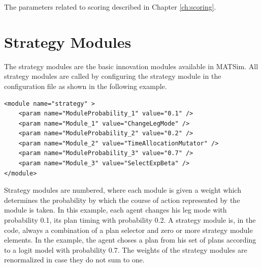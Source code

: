 The parameters related to scoring described in Chapter \ref{ch:scoring}.



\section{Strategy Modules}
\label{sec:strategymodules}

 

The strategy modules are the basic innovation modules available in MATSim. All strategy modules are called by configuring the strategy module in the configuration file as shown in the following example.

\begin{lstlisting}
<module name="strategy" >
    <param name="ModuleProbability_1" value="0.1" />
    <param name="Module_1" value="ChangeLegMode" />
    <param name="ModuleProbability_2" value="0.2" />
    <param name="Module_2" value="TimeAllocationMutator" />
    <param name="ModuleProbability_3" value="0.7" />
    <param name="Module_3" value="SelectExpBeta" />
</module>
\end{lstlisting}

Strategy modules are numbered, where each module is given a weight which determines the probability by which the course of action represented by the module is taken. In this example, each agent changes his leg mode with probability 0.1, its plan timing with probability 0.2. A strategy module is, in the code, always a combination of a plan selector and zero or more strategy module elements. In the example, the agent choses a plan from his set of plans according to a logit model with probability 0.7. The weights of the strategy modules are renormalized in case they do not sum to one.

